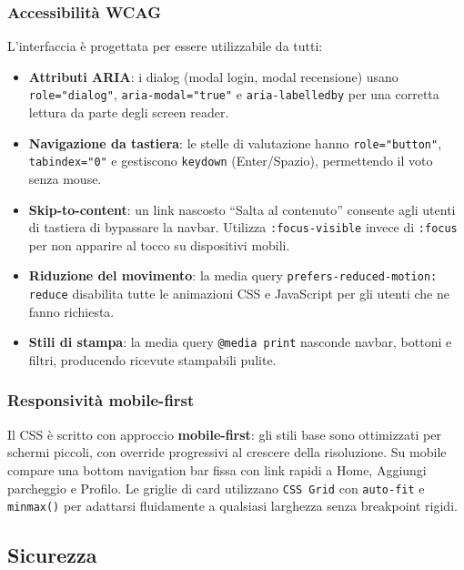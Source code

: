 \documentclass[12pt, a4paper]{article}
\begin{document}
\subsubsection{Accessibilità WCAG}

L'interfaccia è progettata per essere utilizzabile da tutti:

\begin{itemize}
    \item \textbf{Attributi ARIA}: i dialog (modal login, modal recensione) usano
    \texttt{role="dialog"}, \texttt{aria-modal="true"} e \texttt{aria-labelledby}
    per una corretta lettura da parte degli screen reader.

    \item \textbf{Navigazione da tastiera}: le stelle di valutazione hanno
    \texttt{role="button"}, \texttt{tabindex="0"} e gestiscono
    \texttt{keydown} (Enter/Spazio), permettendo il voto senza mouse.

    \item \textbf{Skip-to-content}: un link nascosto ``Salta al contenuto''
    consente agli utenti di tastiera di bypassare la navbar. Utilizza
    \texttt{:focus-visible} invece di \texttt{:focus} per non apparire
    al tocco su dispositivi mobili.

    \item \textbf{Riduzione del movimento}: la media query
    \texttt{prefers-reduced-motion: reduce} disabilita tutte le animazioni
    CSS e JavaScript per gli utenti che ne fanno richiesta.

    \item \textbf{Stili di stampa}: la media query \texttt{@media print}
    nasconde navbar, bottoni e filtri, producendo ricevute stampabili pulite.
\end{itemize}

\subsubsection{Responsività mobile-first}

Il CSS è scritto con approccio \textbf{mobile-first}: gli stili base sono
ottimizzati per schermi piccoli, con override progressivi al crescere della
risoluzione. Su mobile compare una bottom navigation bar fissa con link
rapidi a Home, Aggiungi parcheggio e Profilo. Le griglie di card utilizzano
\texttt{CSS Grid} con \texttt{auto-fit} e \texttt{minmax()} per adattarsi
fluidamente a qualsiasi larghezza senza breakpoint rigidi.

\subsection{Sicurezza}
\end{document}
